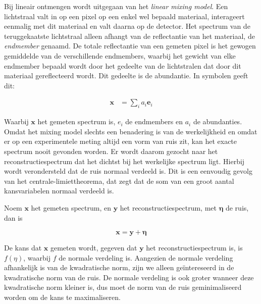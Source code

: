 \documentclass[12pt]{report}
\begin{document}
Bij lineair ontmengen wordt uitgegaan van het \textit{linear mixing model}. Een lichtstraal valt in op een pixel op een enkel wel bepaald materiaal, interageert eenmalig met dit materiaal en valt daarna op de detector. Het spectrum van de teruggekaatste lichtstraal alleen afhangt van de reflectantie van het materiaal, de \textit{endmember} genaamd. De totale reflectantie van een gemeten pixel is het gewogen gemiddelde van de verschillende endmembers, waarbij het gewicht van elke endmember bepaald wordt door het gedeelte van de lichtstralen dat door dit materiaal gereflecteerd wordt. Dit gedeelte is de abundantie. In symbolen geeft dit:




\begin{align}
\bm{x} &= \sum_i a_i \bm{e}_i \label{eq:nq}
\end{align}

Waarbij $\bm{x}$ het gemeten spectrum is, $e_i$ de endmembers en $a_i$ de abundanties. Omdat het mixing model slechts een benadering is van de werkelijkheid en omdat er op een experimentele meting altijd een vorm van ruis zit, kan het exacte spectrum nooit gevonden worden. Er wordt daarom gezocht naar het reconstructiespectrum dat het dichtst bij het werkelijke spectrum ligt. Hierbij wordt verondersteld dat de ruis normaal verdeeld is. Dit is een eenvoudig gevolg van het centrale-limiettheorema, dat zegt dat de som van een groot aantal kansvariabelen normaal verdeeld is. 

Noem $\bm{x}$ het gemeten spectrum, en $\bm{y}$ het reconstructiespectrum, met $\bm{\eta}$ de ruis, dan is

\begin{equation}\label{eq:rec0}
\bm{x} = \bm{y} + \bm{\eta}
\end{equation}

De kans dat $\bm{x}$ gemeten wordt, gegeven dat $\bm{y}$ het reconstructiespectrum is, is $f(\eta)$, waarbij $f$ de normale verdeling is. Aangezien de normale verdeling afhankelijk is van de kwadratische norm, zijn we alleen ge\"intereseerd in de kwadratische norm van de ruis. De normale verdeling is ook groter wanneer deze kwadratische norm kleiner is, dus moet de norm van de ruis geminimaliseerd worden om de kans te maximaliseren.  
\end{document}
